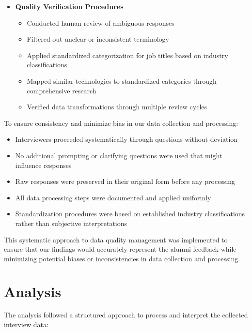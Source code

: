 \documentclass[12pt,a4paper]{article}
\begin{document}
\begin{itemize}
\item \textbf{Quality Verification Procedures}
\begin{itemize}
\item Conducted human review of ambiguous responses
\item Filtered out unclear or inconsistent terminology
\item Applied standardized categorization for job titles based on industry classifications
\item Mapped similar technologies to standardized categories through comprehensive research
\item Verified data transformations through multiple review cycles
\end{itemize}
\end{itemize}
To ensure consistency and minimize bias in our data collection and processing:
\begin{itemize}
\item Interviewers proceeded systematically through questions without deviation
\item No additional prompting or clarifying questions were used that might influence responses
\item Raw responses were preserved in their original form before any processing
\item All data processing steps were documented and applied uniformly
\item Standardization procedures were based on established industry classifications rather than subjective interpretations
\end{itemize}
This systematic approach to data quality management was implemented to ensure that our findings would accurately represent the alumni feedback while minimizing potential biases or inconsistencies in data collection and processing.

\newpage

\section{Analysis}
The analysis followed a structured approach to process and interpret the collected interview data:
\end{document}
